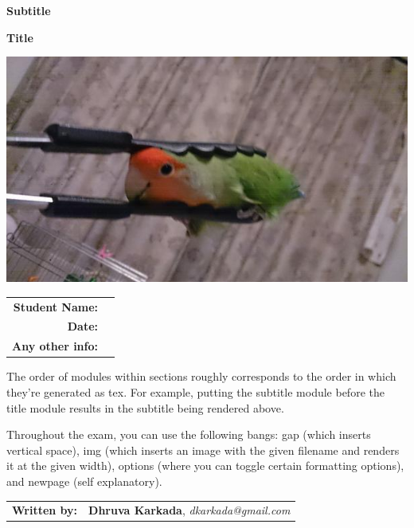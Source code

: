 \documentclass{exam}
\begin{document}
\begin{coverpages}
	\begin{center}
		\vspace{0.05 in}
		\par\noindent\textbf{\large  Subtitle}
		\vspace{0.05 in}
		\vspace{0.10 in}
		\par\noindent\textbf{\Huge   Title}
		\vspace{0.5 in}
		\par\noindent
		\par\noindent
				\includegraphics[width=.7\textwidth]{images/tong.jpg}
		\vspace{0.05 in}
		\vspace{0.5 in}
		\vspace{0.10 in}
		\vspace{0.15 in}
		\par
		\def\arraystretch{2}\tabcolsep=3pt
		\begin{tabular}{r r}
			\textbf{Student Name:} & \makebox[4in]{\hrulefill} \\
			\textbf{Date:} & \makebox[4in]{\hrulefill} \\
			\textbf{Any other info:} & \makebox[4in]{\hrulefill} \\
		\end{tabular}
		\vspace{0.15 in}
	\end{center}
		\vspace{0.15 in}
	\par The order of modules within sections roughly corresponds to the order in which they're generated as tex. For example, putting the subtitle module before the title module results in the subtitle being rendered above.
	\par Throughout the exam, you can use the following bangs: gap (which inserts vertical space), img (which inserts an image with the given filename and renders it at the given width), options (where you can toggle certain formatting options), and newpage (self explanatory).
		\vspace{0.15 in}
	\begin{center}
		\vspace{0.05 in}
		\par
		\def\arraystretch{2}\tabcolsep=3pt
		\begin{tabular}{r r}
			\textbf{{Written by:}}
			 & \textbf{ Dhruva Karkada}, \textit{ dkarkada@gmail.com} \\
		\end{tabular}
		\vspace{0.05 in}
	\end{center}
\end{coverpages}
\end{document}
